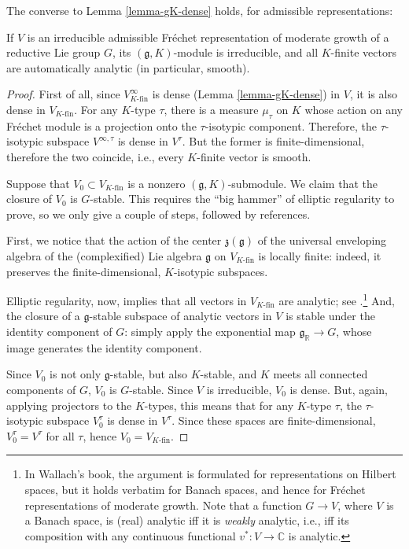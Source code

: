 The converse to Lemma \ref{lemma-gK-dense} holds, for admissible representations: 

\begin{theorem}
 \label{theorem-irreducible-admissible}
If $V$ is an irreducible admissible Fr\'echet representation of moderate growth of a reductive Lie group $G$, its $(\mathfrak g, K)$-module is irreducible, and all $K$-finite vectors are automatically analytic (in particular, smooth).
\end{theorem}

\begin{proof}
First of all, since $V^\infty_{K\text{-fin}}$ is dense (Lemma \ref{lemma-gK-dense}) in $V$, it is also dense in $V_{K\text{-fin}}$. For any $K$-type $\tau$, there is a measure $\mu_\tau$ on $K$ whose action on any Fr\'echet module is a projection onto the $\tau$-isotypic component. Therefore, the $\tau$-isotypic subspace $V^{\infty,\tau}$ is dense in $V^\tau$. But the former is finite-dimensional, therefore the two coincide, i.e., every $K$-finite vector is smooth.

Suppose that $V_0\subset V_{K\text{-fin}}$ is a nonzero $(\mathfrak g, K)$-submodule. We claim that the closure of $V_0$ is $G$-stable. This requires the ``big hammer'' of elliptic regularity to prove, so we only give a couple of steps, followed by references.

First, we notice that the action of the center $\mathfrak z(\mathfrak g)$ of the universal enveloping algebra of the (complexified) Lie algebra $\mathfrak g$ on $V_{K\text{-fin}}$ is locally finite: indeed, it preserves the finite-dimensional, $K$-isotypic subspaces. 

Elliptic regularity, now, implies that all vectors in $V_{K\text{-fin}}$ are analytic; see \cite[3.4.9]{Wallach-RR1}.\footnote{In Wallach's book, the argument is formulated for representations on Hilbert spaces, but it holds verbatim for Banach spaces, and hence for Fr\'echet representations of moderate growth. Note that a function $G\to V$, where $V$ is a Banach space, is (real) analytic iff it is \emph{weakly} analytic, i.e., iff its composition with any continuous functional $v^*: V\to \mathbb C$ is analytic.} And, the closure of a $\mathfrak g$-stable subspace of analytic vectors in $V$ is stable under the identity component of $G$: simply apply the exponential map $\mathfrak g_{\mathbb R} \to G$, whose image generates the identity component. 

Since $V_0$ is not only $\mathfrak g$-stable, but also $K$-stable, and $K$ meets all connected components of $G$, $V_0$ is $G$-stable. Since $V$ is irreducible, $V_0$ is dense. But, again, applying projectors to the $K$-types, this means that for any $K$-type $\tau$, the $\tau$-isotypic subspace $V_0^\tau$ is dense in $V^\tau$. Since these spaces are finite-dimensional, $V_0^\tau=V^\tau$ for all $\tau$, hence $V_0 = V_{K\text{-fin}}$. 
\end{proof}





